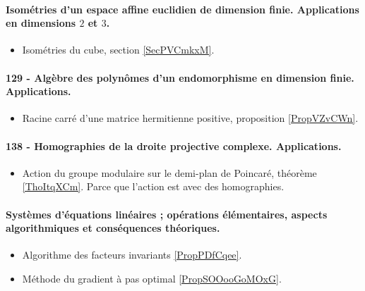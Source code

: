 \paragraph{Isométries d'un espace affine euclidien de dimension finie. Applications en dimensions $2$ et $3$.}
\begin{itemize}
    \item Isométries du cube, section \ref{SecPVCmkxM}.
\end{itemize}
\paragraph{129 - Algèbre des polynômes d'un endomorphisme en dimension finie. Applications.}
\begin{itemize}
    \item Racine carré d'une matrice hermitienne positive, proposition \ref{PropVZvCWn}.
\end{itemize}
\paragraph{138 - Homographies de la droite projective complexe. Applications.}
\begin{itemize}
    \item Action du groupe modulaire sur le demi-plan de Poincaré, théorème \ref{ThoItqXCm}. Parce que l'action est avec des homographies.
\end{itemize}
\paragraph{Systèmes d'équations linéaires ; opérations élémentaires, aspects algorithmiques et conséquences théoriques.}
\begin{itemize}
    \item Algorithme des facteurs invariants \ref{PropPDfCqee}.
    \item Méthode du gradient à pas optimal \ref{PropSOOooGoMOxG}.
\end{itemize}
